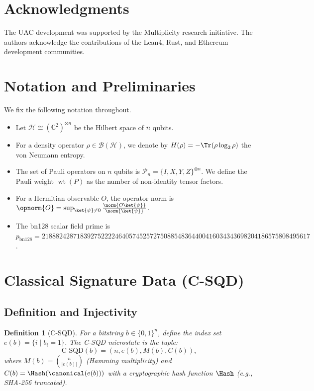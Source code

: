 \documentclass[11pt,a4paper]{article}
\newtheorem{definition}{Definition}
\theoremstyle{plain}
\begin{document}
\section*{Acknowledgments}

The UAC development was supported by the Multiplicity research initiative. The authors acknowledge the contributions of the Lean4, Rust, and Ethereum development communities.

\section{Notation and Preliminaries}

We fix the following notation throughout.

\begin{itemize}
    \item Let $\mathcal{H} \cong (\mathbb{C}^2)^{\otimes n}$ be the Hilbert space of $n$ qubits.
    \item For a density operator $\rho \in \mathcal{B}(\mathcal{H})$, we denote by $H(\rho) = -\Tr(\rho \log_2 \rho)$ the von Neumann entropy.
    \item The set of Pauli operators on $n$ qubits is $\mathcal{P}_n = \{I, X, Y, Z\}^{\otimes n}$. We define the Pauli weight $\operatorname{wt}(P)$ as the number of non-identity tensor factors.
    \item For a Hermitian observable $O$, the operator norm is $\opnorm{O} = \sup_{\ket{\psi} \neq 0} \frac{\norm{O\ket{\psi}}}{\norm{\ket{\psi}}}$.
    \item The bn128 scalar field prime is $p_{\mathrm{bn128}} = 21888242871839275222246405745257275088548364400416034343698204186575808495617$.
\end{itemize}

\section{Classical Signature Data (C-SQD)}

\subsection{Definition and Injectivity}

\begin{definition}[C-SQD]
For a bitstring $b \in \{0,1\}^n$, define the index set $e(b) = \{i \mid b_i = 1\}$. The C-SQD microstate is the tuple:
\[
\text{C-SQD}(b) = (n, e(b), M(b), C(b)),
\]
where $M(b) = \binom{n}{|e(b)|}$ (Hamming multiplicity) and $C(b) = \Hash(\canonical(e(b)))$ with a cryptographic hash function $\Hash$ (e.g., SHA-256 truncated).
\end{definition}
\end{document}
